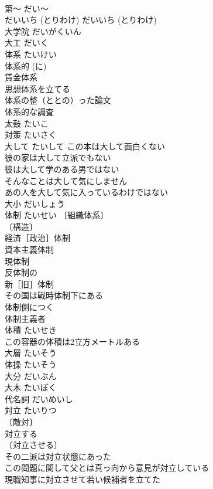 \documentclass[8pt]{extreport}
\begin{document}
\begin{CJK}{UTF8}{min}
\\	第～	だい～	
\\	だいいち (とりわけ)	だいいち (とりわけ)	
\\	大学院	だいがくいん	
\\	大工	だいく	
\\	体系	たいけい	
\\	体系的 (に) 
\\	賃金体系 
\\	思想体系を立てる 
\\	体系の整（ととの）った論文 
\\	体系的な調査 
\\	太鼓	たいこ	
\\	対策	たいさく	
\\	大して	たいして	この本は大して面白くない 
\\	彼の家は大して立派でもない 
\\	彼は大して学のある男ではない 
\\	そんなことは大して気にしません 
\\	あの人を大して気に入っているわけではない 
\\	大小	だいしょう	
\\	体制	たいせい	〔組織体系〕
\\	〔構造〕
\\	経済［政治］体制 
\\	資本主義体制 
\\	現体制 
\\	反体制の 
\\	新［旧］体制 
\\	その国は戦時体制下にある 
\\	体制側につく 
\\	体制主義者 
\\	体積	たいせき	
\\	この容器の体積は2立方メートルある 
\\	大層	たいそう	
\\	体操	たいそう	
\\	大分	だいぶん	
\\	大木	たいぼく	
\\	代名詞	だいめいし	
\\	対立	たいりつ	
\\	〔敵対〕
\\	対立する 
\\	〔対立させる〕
\\	その二派は対立状態にあった 
\\	この問題に関して父とは真っ向から意見が対立している 
\\	現職知事に対立させて若い候補者を立てた 

\end{CJK}
\end{document}
